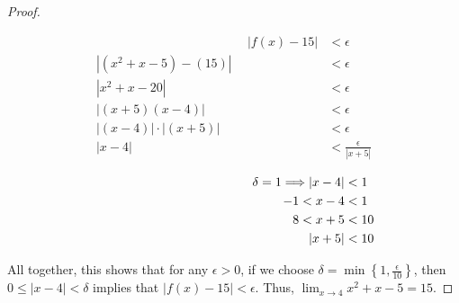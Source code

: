 \begin{enumerate}
\begin{proof}
\begin{multicols}{2}
{\color{blue} %
\begin{align*} %
\hspace{2in}|f(x) - 15| & < \epsilon \\ 
|(x^2 + x - 5) - (15)| & < \epsilon \\
|x^2 + x - 20| & < \epsilon \\
|(x + 5)(x - 4)| & < \epsilon \\
|(x - 4)|\cdot|(x + 5)| & < \epsilon \\
|x - 4| & < \frac{\epsilon}{|x + 5|} \\ 
\end{align*}
\begin{align*}
\hspace{1.75in}\delta = 1 \Longrightarrow |x - 4| & < 1\\
-1 < x - 4 & < 1\\
8 < x + 5 & < 10\\
| x + 5| & < 10
\end{align*}
}
\end{multicols}
All together, this shows that for any $\epsilon >0$, if we choose $\displaystyle{\delta = \min\left\{1, \frac{\epsilon}{10}\right\}}$, then $0 \leq |x - 4| < \delta$ implies that $|f(x) - 15| < \epsilon$.  Thus, $\displaystyle{\lim_{x \rightarrow 4} x^2 + x - 5 = 15}$.

\end{proof}

\newpage %


\end{enumerate}
